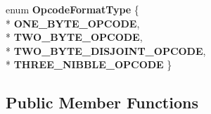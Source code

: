 \begin{DoxyCompactItemize}
\item 
enum {\bfseries Opcode\+Format\+Type} \{ \\*
{\bfseries O\+N\+E\+\_\+\+B\+Y\+T\+E\+\_\+\+O\+P\+C\+O\+DE}, 
\\*
{\bfseries T\+W\+O\+\_\+\+B\+Y\+T\+E\+\_\+\+O\+P\+C\+O\+DE}, 
\\*
{\bfseries T\+W\+O\+\_\+\+B\+Y\+T\+E\+\_\+\+D\+I\+S\+J\+O\+I\+N\+T\+\_\+\+O\+P\+C\+O\+DE}, 
\\*
{\bfseries T\+H\+R\+E\+E\+\_\+\+N\+I\+B\+B\+L\+E\+\_\+\+O\+P\+C\+O\+DE}
 \}\hypertarget{classv8_1_1internal_1_1_instruction_ac894b43bb5eb5aef647496c3e6233381}{}\label{classv8_1_1internal_1_1_instruction_ac894b43bb5eb5aef647496c3e6233381}

\end{DoxyCompactItemize}
\subsection*{Public Member Functions}
